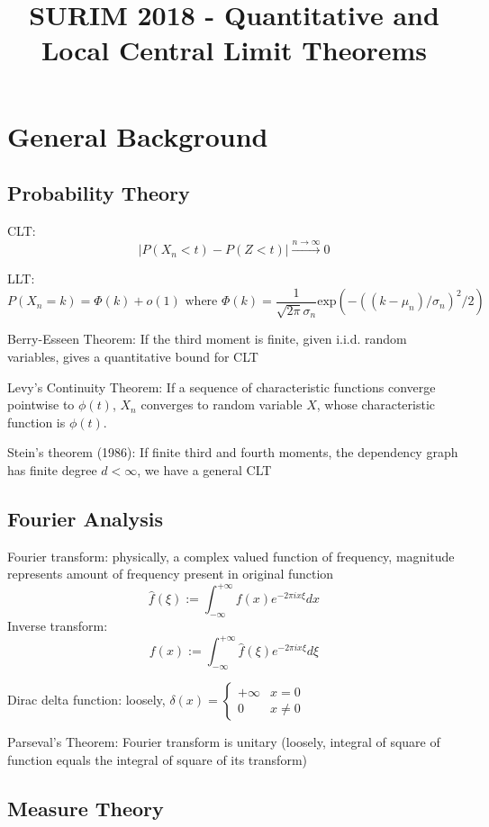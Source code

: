 \documentclass{article}
\title{SURIM 2018 - Quantitative and Local Central Limit Theorems}
\author{}
\date{}
\newcommand{\f}[2]{\frac{#1}{#2}}
\newcommand{\p}[1]{\left(#1\right)}
\newcommand{\abs}[1]{\left\lvert#1\right\rvert}
\theoremstyle{definition}
\theoremstyle{remark}
\begin{document}
\maketitle

\section{General Background}

\subsection{Probability Theory}
CLT: 
\[ \abs{P(X_n < t) - P(Z < t)} \xrightarrow{n \to \infty} 0 \]

LLT:
\[ P(X_n = k) = \Phi(k) + o(1) \text{ where } \Phi(k) = \f{1}{\sqrt{2\pi}\sigma_n} \mathrm{exp}\p{-((k-\mu_n)/\sigma_n)^2/2} \]

Berry-Esseen Theorem: If the third moment is finite, given i.i.d. random variables, gives a quantitative bound for CLT 

Levy's Continuity Theorem: If a sequence of characteristic functions converge pointwise to $\phi(t)$, $X_n$ converges to random variable $X$, whose characteristic function is $\phi(t)$. 

Stein's theorem (1986): If finite third and fourth moments, the dependency graph has finite degree $d < \infty$, we have a general CLT


\subsection{Fourier Analysis}

Fourier transform: physically, a complex valued function of frequency, magnitude represents amount of frequency present in original function
\[ \hat{f}(\xi) := \int_{-\infty}^{+\infty} f(x)e^{-2\pi ix\xi} dx \]
Inverse transform: 
\[ {f}(x) := \int_{-\infty}^{+\infty} \hat{f}(\xi)e^{-2\pi ix\xi} d\xi \]

Dirac delta function: loosely, $\delta(x) = 
\begin{cases} 
      +\infty & x = 0 \\
      0 & x \neq 0 
\end{cases}$

Parseval's Theorem: Fourier transform is unitary (loosely, integral of square of function equals the integral of square of its transform)

\subsection{Measure Theory}
\end{document}
